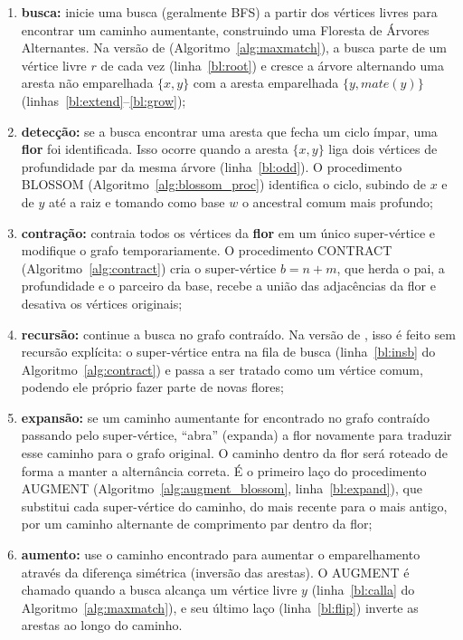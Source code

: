 \begin{enumerate}
    \item \textbf{busca:} inicie uma busca (geralmente BFS) a partir dos vértices livres para encontrar um caminho aumentante, construindo uma Floresta de Árvores Alternantes. Na versão de  (Algoritmo~\ref{alg:maxmatch}), a busca parte de um vértice livre $r$ de cada vez (linha~\ref{bl:root}) e cresce a árvore alternando uma aresta não emparelhada $\{x, y\}$ com a aresta emparelhada $\{y, mate(y)\}$ (linhas~\ref{bl:extend}--\ref{bl:grow});
    \item \textbf{detecção:} se a busca encontrar uma aresta que fecha um ciclo ímpar, uma \textbf{flor} foi identificada. Isso ocorre quando a aresta $\{x, y\}$ liga dois vértices de profundidade par da mesma árvore (linha~\ref{bl:odd}). O procedimento BLOSSOM (Algoritmo~\ref{alg:blossom_proc}) identifica o ciclo, subindo de $x$ e de $y$ até a raiz e tomando como base $w$ o ancestral comum mais profundo;
    \item \textbf{contração:} contraia todos os vértices da \textbf{flor} em um único super-vértice e modifique o grafo temporariamente. O procedimento CONTRACT (Algoritmo~\ref{alg:contract}) cria o super-vértice $b = n + m$, que herda o pai, a profundidade e o parceiro da base, recebe a união das adjacências da flor e desativa os vértices originais;
    \item \textbf{recursão:} continue a busca no grafo contraído. Na versão de , isso é feito sem recursão explícita: o super-vértice entra na fila de busca (linha~\ref{bl:insb} do Algoritmo~\ref{alg:contract}) e passa a ser tratado como um vértice comum, podendo ele próprio fazer parte de novas flores;
    \item \textbf{expansão:} se um caminho aumentante for encontrado no grafo contraído passando pelo super-vértice, ``abra'' (expanda) a flor novamente para traduzir esse caminho para o grafo original. O caminho dentro da flor será roteado de forma a manter a alternância correta. É o primeiro laço do procedimento AUGMENT (Algoritmo~\ref{alg:augment_blossom}, linha~\ref{bl:expand}), que substitui cada super-vértice do caminho, do mais recente para o mais antigo, por um caminho alternante de comprimento par dentro da flor;
    \item \textbf{aumento:} use o caminho encontrado para aumentar o emparelhamento através da diferença simétrica (inversão das arestas). O AUGMENT é chamado quando a busca alcança um vértice livre $y$ (linha~\ref{bl:calla} do Algoritmo~\ref{alg:maxmatch}), e seu último laço (linha~\ref{bl:flip}) inverte as arestas ao longo do caminho.
\end{enumerate}

